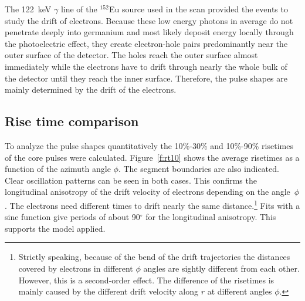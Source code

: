 \documentclass[epj]{svjour}
\begin{document}
The 122~keV $\gamma$ line of the $^{152}$Eu source used in the scan
provided the events to study the drift of electrons. Because these low
energy photons in average do not penetrate deeply into germanium and
most likely deposit energy locally through the photoelectric effect,
they create electron-hole pairs predominantly near the outer surface
of the detector. The holes reach the outer surface almost immediately
while the electrons have to drift through nearly the whole bulk of the
detector until they reach the inner surface. Therefore, the pulse
shapes are mainly determined by the drift of the electrons.

\subsection{Rise time comparison}
\label{s:lon}
To analyze the pulse shapes quantitatively the 10\%-30\% and 10\%-90\%
risetimes of the core pulses were calculated. Figure~\ref{f:rt10}
shows the average risetimes as a function of the azimuth angle
$\phi$. The segment boundaries are also indicated.  Clear oscillation
patterns can be seen in both cases. This confirms the longitudinal
anisotropy of the drift velocity of electrons depending on the
angle~$\phi$. The electrons need different times to drift nearly the
same distance.\footnote{Strictly speaking, because of the bend of the
drift trajectories the distances covered by electrons in different
$\phi$ angles are sightly different from each other.  However, this is
a second-order effect. The difference of the risetimes is mainly
caused by the different drift velocity along $r$ at different angles
$\phi$.} Fits with a sine function give periods of about 90$^{\circ}$
for the longitudinal anisotropy. This supports the model applied.
\end{document}
